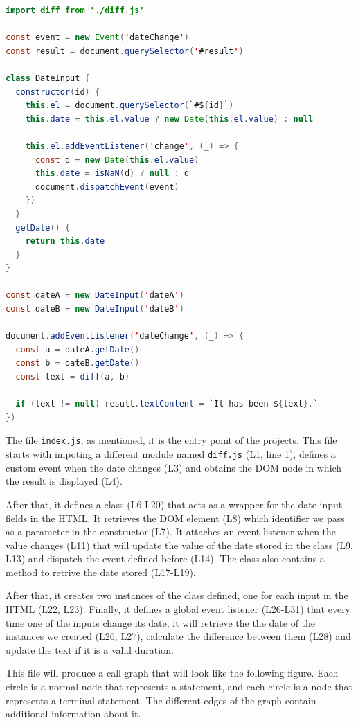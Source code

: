 \documentclass{uvamscse}
\begin{document}
\begin{lstlisting}[language=Java, caption=\texttt{index.js} file of the example web application]
import diff from './diff.js'

const event = new Event('dateChange')
const result = document.querySelector('#result')

class DateInput {
  constructor(id) {
    this.el = document.querySelector(`#${id}`)
    this.date = this.el.value ? new Date(this.el.value) : null

    this.el.addEventListener('change', (_) => {
      const d = new Date(this.el.value)
      this.date = isNaN(d) ? null : d
      document.dispatchEvent(event)
    })
  }
  getDate() {
    return this.date
  }
}

const dateA = new DateInput('dateA')
const dateB = new DateInput('dateB')

document.addEventListener('dateChange', (_) => {
  const a = dateA.getDate()
  const b = dateB.getDate()
  const text = diff(a, b)

  if (text != null) result.textContent = `It has been ${text}.`
})
\end{lstlisting}

The file \texttt{index.js}, as mentioned, it is the entry point of the projects. This file starts with impoting a different module named \texttt{diff.js} (L1, line 1), defines a custom event when the date changes (L3) and obtains the DOM node in which the result is displayed (L4).

After that, it defines a class (L6-L20) that acts as a wrapper for the date input fields in the HTML. It retrieves the DOM element (L8) which identifier we pass as a parameter in the constructor (L7). It attaches an event listener when the value changes (L11) that will update the value of the date stored in the class (L9, L13) and dispatch the event defined before (L14). The class also contains a method to retrive the date stored (L17-L19).

After that, it creates two instances of the class defined, one for each input in the HTML (L22, L23). Finally, it defines a global event listener (L26-L31) that every time one of the inputs change its date, it will retrieve the the date of the instances we created (L26, L27), calculate the difference between them (L28) and update the text if it is a valid duration.

This file will produce a call graph that will look like the following figure. Each circle is a normal node that represents a statement, and each circle is a node that represents a terminal statement. The different edges of the graph contain additional information about it.
\end{document}
